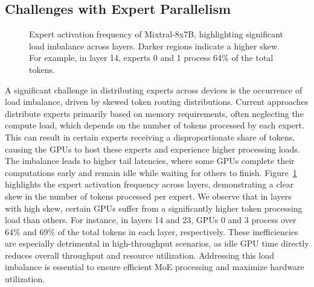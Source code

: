 \subsection{Challenges with Expert Parallelism}

\begin{figure}
    \centering
    
    \vspace{-1.5em}
    \caption{Expert activation frequency of Mixtral-8x7B, highlighting significant load imbalance across layers. Darker regions indicate a higher skew. For example, in layer 14, experts 0 and 1 process 64\% of the total tokens. 
    }
    \label{fig:expert-load-imbalance}
    \vspace{-2ex}
\end{figure}

%
A significant challenge in distributing experts across devices is the occurrence of load imbalance, driven by skewed token routing distributions.
% 
Current approaches distribute experts primarily based on memory requirements, often neglecting the compute load, which depends on the number of tokens processed by each expert.
% 
This can result in certain experts receiving a disproportionate share of tokens, causing the GPUs to host these experts and experience higher processing loads. The imbalance leads to higher tail latencies, where some GPUs complete their computations early and remain idle while waiting for others to finish.
% 
Figure~\ref{fig:expert-load-imbalance} highlights the expert activation frequency across layers, demonstrating a clear skew in the number of tokens processed per expert.
%
We observe that in layers with high skew, certain GPUs suffer from a significantly higher token processing load than others.
%
For instance, in layers 14 and 23, GPUs 0 and 3 process over 64\% and 69\% of the total tokens in each layer, respectively.
%
These inefficiencies are especially detrimental in high-throughput scenarios, as idle GPU time directly reduces overall throughput and resource utilization.
% 
Addressing this load imbalance is essential to ensure efficient MoE processing and maximize hardware utilization.

\noindent{}


